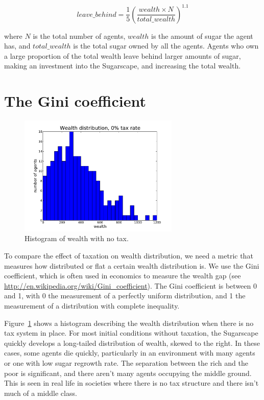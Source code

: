 \documentclass[10pt]{book}
\begin{document}
\[ leave\_behind = \frac{1}{5} 
           \left( \frac{wealth\times N}{total\_wealth} \right)^{1.1} \]

where $N$ is the total number of agents, $wealth$ is the amount of sugar
the agent has, and $total\_wealth$ is the total sugar
owned by all the agents.  Agents who own a large proportion of the
total wealth leave behind larger amounts of sugar, making an
investment into the Sugarscape, and increasing the total wealth.

\section{The Gini coefficient}

\begin{figure}[ht]
\centerline{\includegraphics[width=3.0in]{figs/pmf_notax.pdf}}
\caption{Histogram of wealth with no tax.\label{fig.notax}}
\end{figure}

To compare the effect of taxation on wealth distribution, we need a
metric that measures how distributed or flat a certain wealth
distribution is.  We use the Gini coefficient, which is often used in
economics to measure the wealth gap (see
\url{http://en.wikipedia.org/wiki/Gini_coefficient}). The Gini
coefficient is between 0 and 1, with 0 the measurement of a perfectly
uniform distribution, and 1 the measurement of a distribution with
complete inequality.

Figure~\ref{fig.notax} shows a histogram describing the wealth
distribution when there is no tax system in place. For most initial
conditions without taxation, the Sugarscape quickly develops a
long-tailed distribution of wealth, skewed to the right. In these
cases, some agents die quickly, particularly in an environment with
many agents or one with low sugar regrowth rate. The separation
between the rich and the poor is significant, and there aren't many
agents occupying the middle ground. This is seen in real life in
societies where there is no tax structure and there isn't much of a
middle class.
\end{document}
